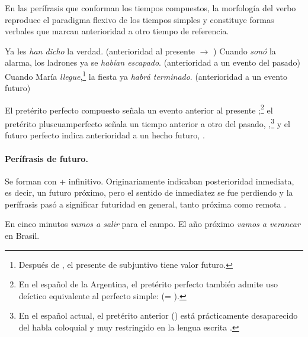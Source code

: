 En las perífrasis que conforman los tiempos compuestos, la morfología del verbo
 reproduce el paradigma flexivo de los tiempos simples y constituye
formas verbales que marcan anterioridad a otro tiempo de referencia.

\begin{exe}
  \ex
    \begin{xlist}
      \ex\label{ex:11-comp-a} Ya les \textit{han dicho} la verdad. (anterioridad
          al presente $\rightarrow$ )
      \ex\label{ex:11-comp-b} Cuando \textit{sonó} la alarma, los ladrones ya se
          \textit{habían escapado}. (anterioridad a un evento del pasado)
      \ex\label{ex:11-comp-c} Cuando María \textit{llegue},\footnote{Después de
          , el presente de subjuntivo  tiene valor
          futuro.} la fiesta ya \textit{habrá terminado}. (anterioridad a un
          evento futuro)
    \end{xlist}
\end{exe}

El pretérito perfecto compuesto  señala un evento anterior al
presente ;\footnote{En el español de la Argentina, el
pretérito perfecto también admite uso deíctico equivalente al perfecto simple:
 (= ).} el pretérito
pluscuamperfecto   señala un
tiempo anterior a otro del pasado, ,\footnote{En el español actual, el pretérito anterior () está prácticamente desaparecido del habla coloquial y muy restringido
en la lengua escrita \parencite{rojo1999}.} y el futuro perfecto   indica anterioridad a un hecho futuro, .

\paragraph{Perífrasis de futuro.} Se forman con  + infinitivo.
Originariamente indicaban posterioridad inmediata, es decir, un futuro próximo,
pero el sentido de inmediatez se fue perdiendo y la perífrasis pasó a significar
futuridad en general, tanto próxima  como remota
.

\begin{exe}
  \ex
    \begin{xlist}
      \ex\label{ex:11-fut-a} En cinco minutos \textit{vamos a salir} para el
          campo.
      \ex\label{ex:11-fut-b} El año próximo \textit{vamos a veranear} en Brasil.
    \end{xlist}
\end{exe}

